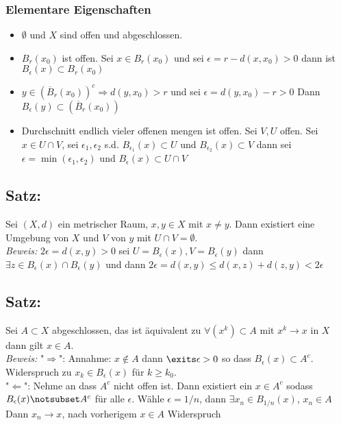 \documentclass[]{scrartcl}
\begin{document}
\subsubsection{Elementare Eigenschaften}
\begin{itemize}
	\item $\emptyset$ und $X$ sind offen und abgeschlossen.
	\item $B_r(x_0)$ ist offen. Sei $x\in B_r(x_0)$ und sei $\epsilon = r-d(x,x_0) > 0$ dann ist $B_\epsilon(x) \subset B_r(x_0)$
	\item $y\in (\overline B_r(x_0))^c \Rightarrow d(y,x_0)>r$ und sei $\epsilon = d(y,x_0) - r > 0$ Dann $B_\epsilon(y)\subset\left(\overline B_r(x_0) \right)$
	\item Durchschnitt endlich vieler offenen mengen ist offen. Sei $V,U$ offen. Sei $x\in U\cap V$, sei $\epsilon_1,\epsilon_2$ s.d. $B_{\epsilon_1}(x) \subset U$ und $B_{\epsilon_2}(x) \subset V$ dann sei $\epsilon = \min(\epsilon_1,\epsilon_2)$ und $B_\epsilon(x) \subset U\cap V$ 
\end{itemize}

\subsection{Satz: }
Sei $(X,d)$ ein metrischer Raum, $x,y\in X$ mit $x\neq y$. Dann existiert eine Umgebung von $X$ und $V$ von $y$ mit $U\cap V = \emptyset$.\\
\textit{Beweis: } $2\epsilon = d(x,y)>0$ sei $U = B_\epsilon(x), V = B_\epsilon(y)$ dann $\exists z \in B_\epsilon(x)\cap B_\epsilon(y)$ und dann $2\epsilon = d(x,y) \leq d(x,z) + d(z,y) < 2\epsilon$ 

\subsection{Satz: }
Sei $A\subset X$ abgeschlossen, das ist äquivalent zu $\forall (x^k)\subset A$ mit $x^k\rightarrow x$ in $X$ dann gilt $x\in A$.\\
\textit{Beweis: } "$\Rightarrow$": Annahme: $x\notin A$ dann $\exits\epsilon >0$ so dass $B_\epsilon (x) \subset A^c$. Widerspruch zu $x_k\in B_\epsilon(x)$ für $k\geq k_0$.\\
"$\Leftarrow$": Nehme an dass $A^c$ nicht offen ist. Dann existiert ein $x\in A^c$ sodass $B_\epsilon (x) \notsubset A^c$ für alle $\epsilon$. Wähle $\epsilon = 1/n$, dann $\exists x_n\in B_{1/n}(x)$, $x_n \in A$ Dann $x_n\rightarrow x$, nach vorherigem $x\in A$ Widerspruch
\end{document}
